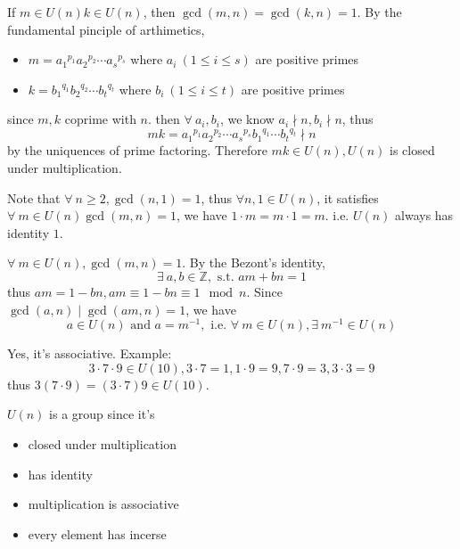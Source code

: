 \documentclass[11pt]{homework}
\newcommand{\Z}{\mathbb{Z}}
\newcommand{\est}{\exists\ }
\newcommand{\fal}{\forall\ }
\newcommand{\st}{\text{ s.t. }}
\newcommand{\ie}{\text{ i.e. }}
\newcommand{\tand}{\text{ and }}
\begin{document}
\question
\begin{alphaparts}
    \questionpart If $m \in U(n) k \in U(n)$, then $\gcd(m,n)=\gcd(k,n)=1$. By the fundamental pinciple of arthimetics,
    \begin{itemize}
        \item $m={a_1}^{p_1}{a_2}^{p_2}\cdots{a_s}^{p_s}$ where $a_i\ (1\leqslant i \leqslant s)$ are positive primes
        \item $k={b_1}^{q_1}{b_2}^{q_2}\cdots{b_t}^{q_t}$ where $b_i\ (1\leqslant i \leqslant t)$ are positive primes
    \end{itemize}
    since $m,k$ coprime with $n$. then $\fal a_i,b_i$, we know $a_i\nmid n,b_i\nmid n$, thus
    \[mk={a_1}^{p_1}{a_2}^{p_2}\cdots{a_s}^{p_s}{b_1}^{q_1}\cdots{b_t}^{q_t}\nmid n\]
    by the uniquences of prime factoring. Therefore $mk\in U(n),U(n)$ is closed under multiplication.

    \questionpart Note that $\fal n\geqslant 2, \gcd(n,1)=1$, thus $\forall n , 1 \in U(n)$, it satisfies $\fal m \in U(n) \gcd(m,n)=1$, we have $1\cdot m=m\cdot 1=m$. i.e. $U(n)$ always has identity $1$.

    \questionpart $\fal m\in U(n),\gcd(m,n)=1$. By the Bezont's identity,
    \[\est a,b\in \Z ,\st am+bn=1\]
    thus $am=1-bn,am\equiv 1-bn\equiv 1\mod n$. Since $\gcd(a,n)\mid\gcd(am,n)=1$, we have
    \[a\in U(n)\tand a=m^{-1},\ie \fal m \in U(n),\est m^{-1} \in U(n)\]

    \questionpart Yes, it's associative. Example:
    \[3\cdot 7\cdot 9\in U(10),3\cdot 7=1,1\cdot 9=9,7\cdot 9=3,3\cdot 3=9\]
    thus $3(7\cdot 9)=(3\cdot 7)9 \in U(10)$.

    \questionpart $U(n)$ is a group since it's
    \begin{itemize}
        \item closed under multiplication
        \item has identity
        \item multiplication is associative
        \item every element has incerse
    \end{itemize}
\end{alphaparts}
\end{document}
